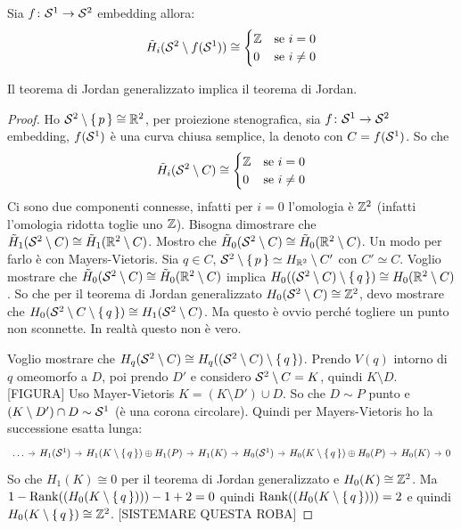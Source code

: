 \begin{example}
  Sia $ f \colon \mathcal{S}^{1} \to \mathcal{S}^{2} $ embedding allora:
  \[
    \tilde{H}_i(\mathcal{S}^{2} \setminus f(\mathcal{S}^{1})) \cong
    \begin{cases}
      \mathbb{Z} & \text{se } i = 0 \\
      0 & \text{se } i \not = 0
    \end{cases}
  \]
\end{example}

\begin{proposition}
  Il teorema di Jordan generalizzato implica il teorema di Jordan.
\end{proposition}
\begin{proof}
  Ho $ \mathcal{S}^{2} \setminus \set{p} \cong \mathbb{R}^{2} $, per proiezione stenografica,
  sia $ f \colon \mathcal{S}^{1} \to \mathcal{S}^{2} $ embedding,
  $ f(\mathcal{S}^{1}) $ è una curva chiusa semplice, la denoto con $ C = f(\mathcal{S}^{1})$. So che
  \[
    \tilde{H}_i(\mathcal{S}^{2} \setminus C ) \cong
    \begin{cases}
      \mathbb{Z} & \text{se } i = 0 \\
      0 & \text{se } i \not = 0
    \end{cases}
  \]
  Ci sono due componenti connesse, infatti per $ i = 0 $ l'omologia è $ \mathbb{Z}^2 $ (infatti
  l'omologia ridotta toglie uno $ \mathbb{Z} $). Bisogna dimostrare che
  $ \tilde{H}_1(\mathcal{S}^{2} \setminus C) \cong \tilde{H}_1(\mathbb{R}^{2} \setminus C) $. Mostro che
  $ \tilde{H}_0(\mathcal{S}^{2} \setminus C) \cong \tilde{H}_0(\mathbb{R}^{2} \setminus C) $. Un modo per farlo è
  con Mayers-Vietoris. Sia $ q \in C $,
  $ \mathcal{S}^{2} \setminus \set{p} \simeq H_{\mathbb{R}^{2}} \setminus C' $ con $ C' \simeq C $.
  Voglio mostrare che  $ \tilde{H}_0(\mathcal{S}^{2} \setminus C) \cong \tilde{H}_0(\mathbb{R}^{2} \setminus C) $
  implica $ H_0((\mathcal{S}^{2} \setminus C) \setminus \set{q}) \cong H_0(\mathbb{R}^{2} \setminus C) $.
  So che per il teorema di Jordan generalizzato $ H_0(\mathcal{S}^{2} \setminus C) \cong \mathbb{Z}^2 $,
  devo mostrare che $ H_0(\mathcal{S}^{2} \setminus C \setminus \set{q}) \cong H_1(\mathcal{S}^{2} \setminus C) $.
  Ma questo è ovvio perché togliere un punto non sconnette. In realtà questo non
  è vero.

  Voglio mostrare che $ H_q(\mathcal{S}^{2} \setminus C) \cong H_q((\mathcal{S}^{2} \setminus C) \setminus \set{q}) $.
  Prendo $ V(q) $ intorno di $ q $ omeomorfo a $ D $, poi prendo $ D' $
  e considero $ \mathcal{S}^{2} \setminus C = K $, quindi $ K \setminus D $.
  [FIGURA]
  Uso Mayer-Vietoris $ K = (K \setminus D') \cup D $. So che $ D \sim P $ punto e
  $ (K \setminus D') \cap D \sim \mathcal{S}^{1} $ (è una corona circolare). Quindi per
  Mayers-Vietoris ho la successione esatta lunga:
  \[
    \begin{tikzcd}[nodes={column sep=7pt}]
      \dots \rar & H_1(\Sph{1}) \rar & H_1(K \setminus \set{q}) \oplus H_1(P) \rar & H_1(K) \rar & H_0(\Sph{1}) \rar & H_0(K \setminus \set{q})
      \oplus H_0(P) \rar & H_0(K) \rar & 0
    \end{tikzcd}
  \]
  So che $ H_1(K) \cong 0 $ per il teorema di Jordan generalizzato e $ H_0(K) \cong \mathbb{Z}^2 $.
  Ma $ 1 - \mathrm{Rank}( (H_0(K \setminus \set{q})) ) -1 + 2 = 0 $ quindi $ \mathrm{Rank}( (H_0(K \setminus \set{q})) ) = 2 $
  e quindi $ H_0(K \setminus \set{q}) \cong \mathbb{Z}^2 $.
  [SISTEMARE QUESTA ROBA]
\end{proof}

